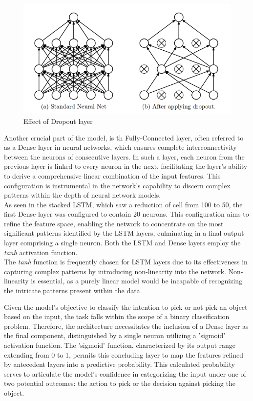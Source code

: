 \begin{figure}[H]
  \centering
  
  \includegraphics[scale=0.4]{Figures/Chapter4/Droput.png}

  \caption{Effect of Dropout layer}
  \label{fig:Dropout}

\end{figure}

Another crucial part of the model, is th Fully-Connected layer, often referred to as a Dense layer in neural networks, which ensures complete interconnectivity between the neurons of consecutive layers. 
In such a layer, each neuron from the previous layer is linked to every neuron in the next, facilitating the layer's ability to derive a comprehensive linear combination of the input features. 
This configuration is instrumental in the network's capability to discern complex patterns within the depth of neural network models.\\
As seen in the stacked LSTM, which saw a reduction of cell from 100 to 50, the first Dense layer was configured to contain 20 neurons. 
This configuration aims to refine the feature space, enabling the network to concentrate on the most significant patterns identified by the LSTM layers, culminating in a final output layer comprising a single neuron. 
Both the LSTM and Dense layers employ the \textit{tanh} activation function.\\
The \textit{tanh} function is frequently chosen for LSTM layers due to its effectiveness in capturing complex patterns by introducing non-linearity into the network. 
Non-linearity is essential, as a purely linear model would be incapable of recognizing the intricate patterns present within the data.

Given the model's objective to classify the intention to pick or not pick an object based on the input, the task falls within the scope of a binary classification problem. 
Therefore, the architecture necessitates the inclusion of a Dense layer as the final component, distinguished by a single neuron utilizing a 'sigmoid' activation function. 
The 'sigmoid' function, characterized by its output range extending from 0 to 1, permits this concluding layer to map the features refined by antecedent layers into a predictive probability. 
This calculated probability serves to articulate the model's confidence in categorizing the input under one of two potential outcomes: the action to pick or the decision against picking the object.

